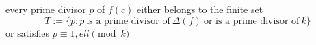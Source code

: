 every prime divisor $p$ of $f(c)$ either belongs to the finite set 
\begin{equation*}
T:=\{p: p \ \text{is a prime divisor of} \ \Delta(f) \ \text{or is a prime divisor of} \ {k}\}
\end{equation*}
or satisfies $p\equiv 1,{ell}\pmod{{k}}$
